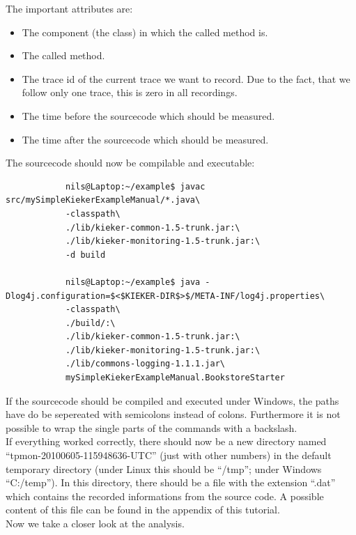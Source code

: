 		The important attributes are:
		\begin{itemize}
			\item The component (the class) in which the called method is.
			\item The called method.
			\item The trace id of the current trace we want to record. Due to the fact, that we follow only one trace, this is zero in all recordings.
			\item The time before the sourcecode which should be measured.
			\item The time after the sourcecode which should be measured.
		\end{itemize}
		  
		The sourcecode should now be compilable and executable:
		
		
		\setBashListing
		\begin{lstlisting}
			nils@Laptop:~/example$ javac src/mySimpleKiekerExampleManual/*.java\
			-classpath\
			./lib/kieker-common-1.5-trunk.jar:\
			./lib/kieker-monitoring-1.5-trunk.jar:\
			-d build

			nils@Laptop:~/example$ java -Dlog4j.configuration=$<$KIEKER-DIR$>$/META-INF/log4j.properties\
			-classpath\
			./build/:\
			./lib/kieker-common-1.5-trunk.jar:\
			./lib/kieker-monitoring-1.5-trunk.jar:\
			./lib/commons-logging-1.1.1.jar\
			mySimpleKiekerExampleManual.BookstoreStarter
		\end{lstlisting}
		If the sourcecode should be compiled and executed under Windows, the paths have do be sepereated with semicolons instead of colons. Furthermore it is not possible to wrap the single parts of the commands with a backslash.\\
		If everything worked correctly, there should now be a new directory named ``tpmon-20100605-115948636-UTC'' (just with other numbers) in the default temporary directory (under Linux this should be ``/tmp''; under Windows ``C:/temp''). In this directory, there should be a file with the extension ``.dat'' which contains the recorded informations from the source code. A possible content of this file can be found in the appendix of this tutorial.\\
		Now we take a closer look at the analysis.

